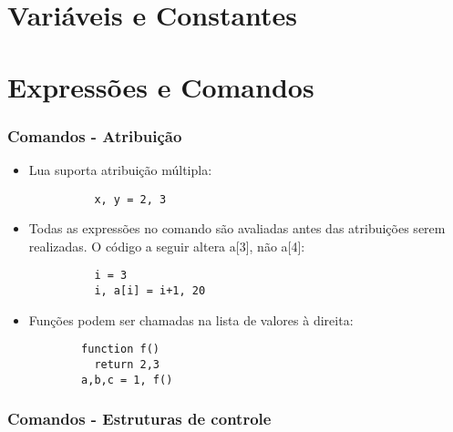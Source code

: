 \documentclass{ime-beamer}
\begin{document}
\section{Variáveis e Constantes}

\section{Expressões e Comandos}
\begin{frame}[fragile]
  \frametitle{Comandos - Atribuição}
  \begin{block}{}
    \begin{itemize}
      \item Lua suporta atribuição múltipla:
        \begin{lstlisting}
          x, y = 2, 3
        \end{lstlisting}
      \item Todas as expressões no comando são avaliadas antes das atribuições serem
        realizadas. O código a seguir altera a[3], não a[4]:
        \begin{lstlisting}
          i = 3
          i, a[i] = i+1, 20
        \end{lstlisting}
      \item Funções podem ser chamadas na lista de valores à direita:
        \begin{lstlisting}
        function f()
          return 2,3
        a,b,c = 1, f()
        \end{lstlisting}
    \end{itemize}
  \end{block}{}
\end{frame}

\begin{frame}[fragile]
  \frametitle{Comandos - Estruturas de controle}
  \begin{block}{}
  \end{block}
\end{frame}
\end{document}
